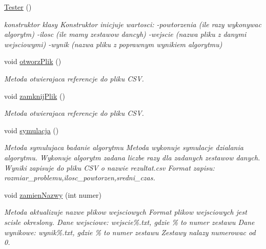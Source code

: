 \begin{DoxyCompactItemize}
\item 
\hypertarget{class_tester_ad70b2b2bbf6c564e710680ec1e0ae2d6}{\hyperlink{class_tester_ad70b2b2bbf6c564e710680ec1e0ae2d6}{Tester} ()}\label{class_tester_ad70b2b2bbf6c564e710680ec1e0ae2d6}

\begin{DoxyCompactList}\small\item\em konstruktor klasy Konstruktor inicjuje wartosci\-: -\/powtorzenia (ile razy wykonywac algorytm) -\/ilosc (ile mamy zestawow dancyh) -\/wejscie (nazwa pliku z danymi wejsciowymi) -\/wynik (nazwa pliku z poprawnym wynikiem algorytmu) \end{DoxyCompactList}\item 
\hypertarget{class_tester_aadfaa4b0d4b7724c6c244d74241671cd}{void \hyperlink{class_tester_aadfaa4b0d4b7724c6c244d74241671cd}{otworz\-Plik} ()}\label{class_tester_aadfaa4b0d4b7724c6c244d74241671cd}

\begin{DoxyCompactList}\small\item\em Metoda otwierajaca referencje do pliku C\-S\-V. \end{DoxyCompactList}\item 
\hypertarget{class_tester_aa6f8bb3a1049653cdeb9909f646d550f}{void \hyperlink{class_tester_aa6f8bb3a1049653cdeb9909f646d550f}{zamknij\-Plik} ()}\label{class_tester_aa6f8bb3a1049653cdeb9909f646d550f}

\begin{DoxyCompactList}\small\item\em Metoda otwierajaca referencje do pliku C\-S\-V. \end{DoxyCompactList}\item 
\hypertarget{class_tester_a0239bffc9d3bc51230e1c6d0e2ec39b4}{void \hyperlink{class_tester_a0239bffc9d3bc51230e1c6d0e2ec39b4}{symulacja} ()}\label{class_tester_a0239bffc9d3bc51230e1c6d0e2ec39b4}

\begin{DoxyCompactList}\small\item\em Metoda symulujaca badanie algorytmu Metoda wykonuje symulacje dzialania algorytmu. Wykonuje algorytm zadana liczbe razy dla zadanych zestawow danych. Wyniki zapisuje do pliku C\-S\-V o nazwie rezultat.\-csv Format zapisu\-: rozmiar\-\_\-problemu,ilosc\-\_\-powtorzen,sredni\-\_\-czas. \end{DoxyCompactList}\item 
void \hyperlink{class_tester_aa208dd32e74e6aef23683b8de4282295}{zamien\-Nazwy} (int numer)
\begin{DoxyCompactList}\small\item\em Metoda aktualizuje nazwe plikow wejsciowych Format plikow wejsciowych jest scisle okreslony. Dane wejsciowe\-: wejscie\%.txt, gdzie \% to numer zestawu Dane wynikowe\-: wynik\%.txt, gdzie \% to numer zestawu Zestawy nalazy numerowac od 0. \end{DoxyCompactList}\end{DoxyCompactItemize}


